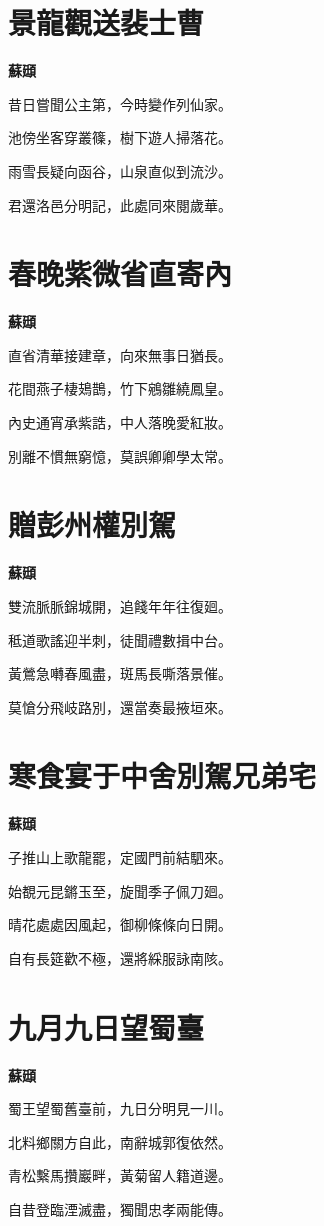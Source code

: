 \documentclass[12pt,a4paper]{ctexbook}
\begin{document}
\section{景龍觀送裴士曹}
\textbf{蘇頲}\par\vspace{0.5em}
昔日嘗聞公主第，今時變作列仙家。\par
池傍坐客穿叢篠，樹下遊人掃落花。\par
雨雪長疑向函谷，山泉直似到流沙。\par
君還洛邑分明記，此處同來閱歲華。\par

\section{春晚紫微省直寄內}
\textbf{蘇頲}\par\vspace{0.5em}
直省清華接建章，向來無事日猶長。\par
花間燕子棲鳷鵲，竹下鵷雛繞鳳皇。\par
內史通宵承紫誥，中人落晚愛紅妝。\par
別離不慣無窮憶，莫誤卿卿學太常。\par

\section{贈彭州權別駕}
\textbf{蘇頲}\par\vspace{0.5em}
雙流脈脈錦城開，追餞年年往復廻。\par
秪道歌謠迎半刺，徒聞禮數揖中台。\par
黃鶯急囀春風盡，斑馬長嘶落景催。\par
莫愴分飛岐路別，還當奏最掖垣來。\par

\section{寒食宴于中舍別駕兄弟宅}
\textbf{蘇頲}\par\vspace{0.5em}
子推山上歌龍罷，定國門前結駟來。\par
始覩元昆鏘玉至，旋聞季子佩刀廻。\par
晴花處處因風起，御柳條條向日開。\par
自有長筵歡不極，還將綵服詠南陔。\par

\section{九月九日望蜀臺}
\textbf{蘇頲}\par\vspace{0.5em}
蜀王望蜀舊臺前，九日分明見一川。\par
北料鄉關方自此，南辭城郭復依然。\par
青松繫馬攢巖畔，黃菊留人籍道邊。\par
自昔登臨湮滅盡，獨聞忠孝兩能傳。\par
\end{document}
